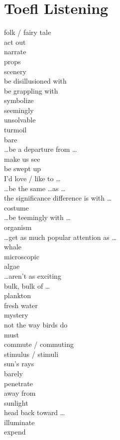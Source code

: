 \documentclass[12pt]{article}
\begin{document}
\section{Toefl Listening}
folk / fairy tale \\
act out \\
narrate \\
props \\
scenery \\
be disillusioned with \\
be grappling with \\
symbolize \\
seemingly \\
unsolvable \\
turmoil \\
bare \\
\dots be a departure from \dots \\
make us see \\
be swept up \\
I'd love / like to \dots \\
\dots be the same \dots as \dots \\
the significance difference is with \dots \\
costume \\
\dots be teemingly with \dots \\
organism \\
\dots get as much popular attention as \dots \\
whale \\
microscopic \\
algae \\
\dots aren't as exciting \\
bulk, bulk of \dots \\
plankton \\
fresh water \\
mystery \\
not the way birds do \\
must \\
commute / commuting \\
stimulus / stimuli \\
sun's rays \\
barely \\
penetrate \\
away from \\
sunlight \\
head back toward \dots \\
illuminate \\
expend \\
\end{document}
